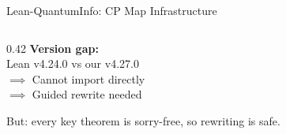 \documentclass[aspectratio=169,10pt]{beamer}
\begin{document}
\begin{frame}{Lean-QuantumInfo: CP Map Infrastructure}
\begin{columns}[T]
\begin{column}{0.42\textwidth}
\vspace{0.5em}
\textcolor{softred}{\textbf{Version gap:}}\\
{\small Lean v4.24.0 vs our v4.27.0}\\
{\small $\implies$ Cannot import directly}\\
{\small $\implies$ Guided rewrite needed}

\vspace{0.3em}
\textcolor{dimwhite}{\footnotesize But: every key theorem is sorry-free, so rewriting is safe.}
\end{column}
\end{columns}
\end{frame}

\end{document}
